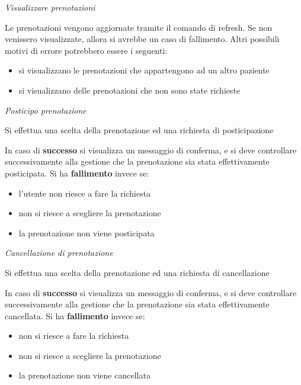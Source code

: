 \begin{description}
\begin{itemize}
 \diam \textit{Visualizzare prenotazioni}


  Le prenotazioni vengono aggiornate tramite il comando di refresh. Se non 
  venissero visualizzate, allora si avrebbe un caso di fallimento. Altri possibili
  motivi di errore potrebbero essere i seguenti:
  \begin{itemize}
  \item si visualizzano le prenotazioni che appartengono ad un altro paziente
  \item si visualizzano delle prenotazioni che non sono state richieste
  \end{itemize}                                                                                                           

 \diam \textit{Posticipo prenotazione}


  Si effettua una scelta della prenotazione
  ed una richiesta di posticipazione


  In caso di \textbf{successo} si visualizza un messaggio di conferma, e si deve controllare
  successivamente alla gestione che la prenotazione sia stata effettivamente 
  posticipata. Si ha \textbf{fallimento} invece se:
  \begin{itemize}
  \item l'utente non riesce a fare la richiesta
  \item non si riesce a scegliere la prenotazione
  \item la prenotazione non viene posticipata
  \end{itemize}
                                                                                                                        

 \diam \textit{Cancellazione di prenotazione}


   Si effettua una scelta della prenotazione
  ed una richiesta di cancellazione

  In caso di \textbf{successo} si visualizza un messaggio di conferma, e si deve controllare
  successivamente alla gestione che la prenotazione sia stata effettivamente 
  cancellata. Si ha \textbf{fallimento} invece se:
  
  \begin{itemize} 
  \item non si riesce a fare la richiesta
  \item non si riesce a scegliere la prenotazione
  \item la prenotazione non viene cancellata
  \end{itemize}


\end{itemize}
\end{description}
